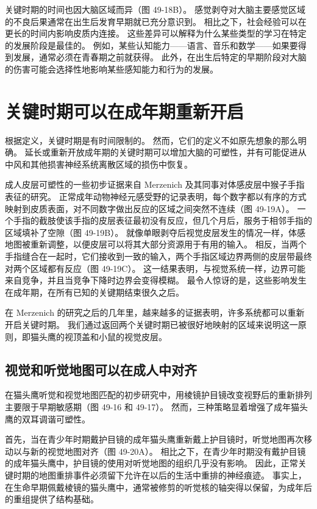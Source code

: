 关键时期的时间也因大脑区域而异（图 49-18B）。 感觉剥夺对大脑主要感觉区域的不良后果通常在出生后发育早期就已充分意识到。 相比之下，社会经验可以在更长的时间内影响皮质内连接。 这些差异可以解释为什么某些类型的学习在特定的发展阶段是最佳的。 例如，某些认知能力——语言、音乐和数学——如果要得到发展，通常必须在青春期之前就获得。 此外，在出生后特定的早期阶段对大脑的伤害可能会选择性地影响某些感知能力和行为的发展。


\section{关键时期可以在成年期重新开启}
根据定义，关键时期是有时间限制的。 然而，它们的定义不如原先想象的那么明确。 延长或重新开放成年期的关键时期可以增加大脑的可塑性，并有可能促进从中风和其他损害神经系统离散区域的损伤中恢复。

成人皮层可塑性的一些初步证据来自 Merzenich 及其同事对体感皮层中猴子手指表征的研究。 正常成年动物神经元感受野的记录表明，每个数字都以有序的方式映射到皮质表面，对不同数字做出反应的区域之间突然不连续（图 49-19A）。 一个手指的截肢使该手指的皮层表征最初没有反应，但几个月后，服务于相邻手指的区域填补了空隙（图 49-19B）。 就像单眼剥夺后视觉皮层发生的情况一样，体感地图被重新调整，以便皮层可以将其大部分资源用于有用的输入。 相反，当两个手指缝合在一起时，它们接收到一致的输入，两个手指区域边界两侧的皮层带最终对两个区域都有反应（图 49-19C）。 这一结果表明，与视觉系统一样，边界可能来自竞争，并且当竞争下降时边界会变得模糊。 最令人惊讶的是，这些影响发生在成年期，在所有已知的关键期结束很久之后。

在 Merzenich 的研究之后的几年里，越来越多的证据表明，许多系统都可以重新开启关键时期。 我们通过返回两个关键时期已被很好地映射的区域来说明这一原则，即猫头鹰的视顶盖和小鼠的视觉皮层。

\subsection{视觉和听觉地图可以在成人中对齐}
在猫头鹰听觉和视觉地图匹配的初步研究中，用棱镜护目镜改变视野后的重新排列主要限于早期敏感期（图 49-16 和 49-17）。 然而，三种策略显着增强了成年猫头鹰的双耳调谐可塑性。

首先，当在青少年时期戴护目镜的成年猫头鹰重新戴上护目镜时，听觉地图再次移动以与新的视觉地图对齐（图 49-20A）。 相比之下，在青少年时期没有戴护目镜的成年猫头鹰中，护目镜的使用对听觉地图的组织几乎没有影响。 因此，正常关键时期的地图重排事件必须留下允许在以后的生活中重排的神经痕迹。 事实上，在生命早期佩戴棱镜的猫头鹰中，通常被修剪的听觉核的轴突得以保留，为成年后的重组提供了结构基础。

